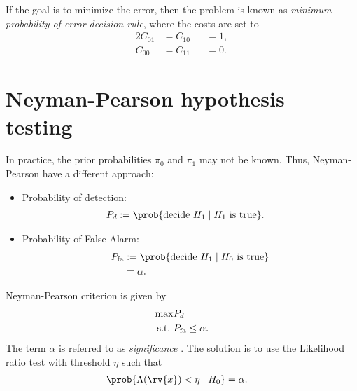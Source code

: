 If the goal is to minimize the error, then the problem is known as \emph{minimum probability of error decision rule}, where the costs are set to
\begin{alignat}{2}
    C_{01} &= C_{10} &&= 1,\\
    C_{00} &= C_{11} &&= 0.
\end{alignat}

\section{Neyman-Pearson hypothesis testing}
In practice, the prior probabilities $\pi_{0}$ and $\pi_{1}$ may not be known. Thus, Neyman-Pearson have a different approach:
\begin{itemize}
    \item Probability of detection: 
    \begin{align}
        \symProb_{d} &:= \prob{\text{decide } H_{1} \mid H_{1} \text{ is true}}.
    \end{align}
    \item Probability of False Alarm: 
    \begin{align}
        \symProb_{\mathrm{fa}} &:= \prob{\text{decide } H_{1} \mid H_{0} \text{ is true}}\\
        &= \alpha.
    \end{align}
\end{itemize}
Neyman-Pearson criterion is given by
\begin{align}
    \max &P_{d}\\
    \mathrm{s.t.}~ &P_{\mathrm{fa}}\leq\alpha.
\end{align}
The term $\alpha$ is referred to as \emph{significance} \cite{li_common_2008}.
The solution is to use the Likelihood ratio test with threshold $\eta$ such that
\begin{align}
    \prob{\Lambda(\rv{x}) < \eta \mid H_{0}} &= \alpha.
\end{align}

